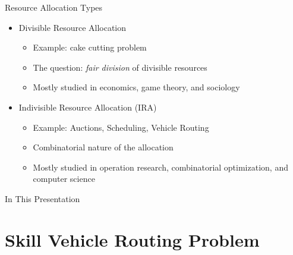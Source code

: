 \begin{frame}[t]{Resource Allocation Types}
    \begin{itemize}
        \item<2-> Divisible Resource Allocation
            \begin{itemize}
                \item<3-> Example: cake cutting problem
            	\item<4-> The question: \emph{fair division} of divisible resources
            	\item<5-> Mostly studied in  economics, game theory, and sociology
            \end{itemize}
        \item<6-> Indivisible Resource Allocation (\alert{IRA})
            \begin{itemize}
                \item<7-> Example: Auctions, Scheduling, Vehicle Routing
                \item<8-> Combinatorial nature of the allocation
                \item<9-> Mostly studied in operation research, combinatorial optimization, and computer science
            \end{itemize}  
    \end{itemize}
\end{frame}

\begin{frame}{In This Presentation}
  \tableofcontents
\end{frame}

\section{Skill Vehicle Routing Problem}
\frame{\insertsection}

